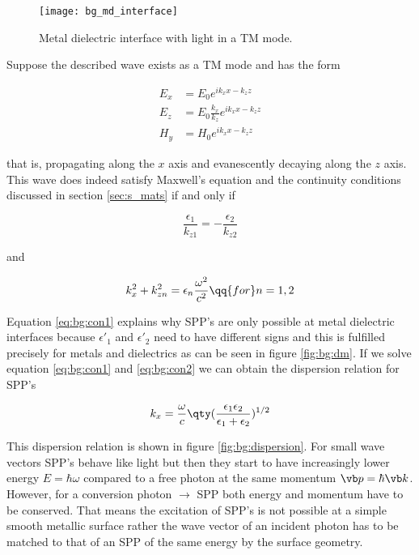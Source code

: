 \begin{figure}[H]
    \centering
    \texttt{[image: bg\_md\_interface]}
    \caption{Metal dielectric interface with light in a TM mode.}
    \label{fig:bg:md_inderface}
\end{figure}

Suppose the described wave exists as a TM mode and has the form 

\begin{equation}
\begin{aligned}
    E_x &= E_0 e^{i k_x x - k_z z} \\
    E_z &= E_0 \frac{k_x}{k_z} e^{i k_x x - k_z z}\\
    H_y &= H_0 e^{i k_x x - k_z z}
\end{aligned}
\end{equation}

that is, propagating along the $x$ axis and evanescently decaying along the $z$ axis. This wave does indeed satisfy Maxwell's equation and the continuity conditions discussed in section \ref{sec:s_mats} if and only if \cite{Maier2007}

\begin{equation} \label{eq:bg:con1}
    \frac{\epsilon_1}{k_{z1}} = - \frac{\epsilon_2}{k_{z2}} 
\end{equation}

and

\begin{equation} \label{eq:bg:con2}
    k_x^2 + k_{zn}^2 = \epsilon_n \frac{\omega^2}{c^2}
    \qq{for}
    n = 1,2
\end{equation}

Equation \eqref{eq:bg:con1} explains why SPP's are only possible at metal dielectric interfaces because $\epsilon'_1$ and $\epsilon'_2$ need to have different signs and this is fulfilled precisely for metals and dielectrics as can be seen in figure \ref{fig:bg:dm}. If we solve equation \eqref{eq:bg:con1} and \eqref{eq:bg:con2} we can obtain the dispersion relation for SPP's

\begin{equation}
    k_x = \frac{\omega}{c}
    \qty(\frac{\epsilon_1 \epsilon_2}{\epsilon_1 + \epsilon_2})^{1/2}
\end{equation}

This dispersion relation is shown in figure \ref{fig:bg:dispersion}. For small wave vectors SPP's behave like light but then they start to have increasingly lower energy $E = \hbar \omega$ compared to a free photon at the same momentum $\vb p = \hbar \vb k$. However, for a conversion photon $\rightarrow$ SPP both energy and momentum have to be conserved. That means the excitation of SPP's is not possible at a simple smooth metallic surface rather the wave vector of an incident photon has to be matched to that of an SPP of the same energy by the surface geometry. 


